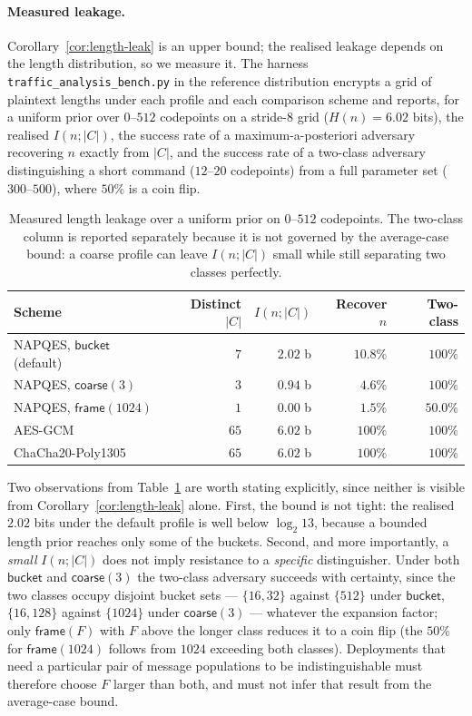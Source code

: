 \documentclass[11pt,a4paper]{article}
\begin{document}
\paragraph{Measured leakage.}
Corollary~\ref{cor:length-leak} is an upper bound; the realised leakage
depends on the length distribution, so we measure it. The harness
\texttt{traffic\_analysis\_bench.py} in the reference distribution encrypts a
grid of plaintext lengths under each profile and each comparison scheme and
reports, for a uniform prior over $0$--$512$ codepoints on a stride-$8$ grid
($H(n)=6.02$ bits), the realised $I(n;|C|)$, the success rate of a
maximum-a-posteriori adversary recovering $n$ exactly from $|C|$, and the
success rate of a two-class adversary distinguishing a short command
($12$--$20$ codepoints) from a full parameter set ($300$--$500$), where
$50\%$ is a coin flip.

\begin{table}[h]
\centering
\begin{tabular}{@{}lrrrr@{}}
\toprule
Scheme & Distinct $|C|$ & $I(n;|C|)$ & Recover $n$ & Two-class \\
\midrule
NAPQES, $\mathsf{bucket}$ (default) & $7$ & $2.02$ b & $10.8\%$ & $100\%$ \\
NAPQES, $\mathsf{coarse}(3)$        & $3$ & $0.94$ b & $4.6\%$ & $100\%$ \\
NAPQES, $\mathsf{frame}(1024)$      & $1$ & $0.00$ b & $1.5\%$ & $50.0\%$ \\
AES-GCM                             & $65$ & $6.02$ b & $100\%$ & $100\%$ \\
ChaCha20-Poly1305                   & $65$ & $6.02$ b & $100\%$ & $100\%$ \\
\bottomrule
\end{tabular}
\caption{Measured length leakage over a uniform prior on $0$--$512$
codepoints. The two-class column is reported separately because it is not
governed by the average-case bound: a coarse profile can leave $I(n;|C|)$
small while still separating two classes perfectly.}
\label{tab:length-leak-measured}
\end{table}

Two observations from Table~\ref{tab:length-leak-measured} are worth stating
explicitly, since neither is visible from
Corollary~\ref{cor:length-leak} alone. First, the bound is not tight: the
realised $2.02$ bits under the default profile is well below $\log_2 13$,
because a bounded length prior reaches only some of the buckets. Second, and
more importantly, a \emph{small} $I(n;|C|)$ does not imply resistance to a
\emph{specific} distinguisher. Under both $\mathsf{bucket}$ and
$\mathsf{coarse}(3)$ the two-class adversary succeeds with certainty, since
the two classes occupy disjoint bucket sets — $\{16,32\}$ against
$\{512\}$ under $\mathsf{bucket}$, $\{16,128\}$ against $\{1024\}$ under
$\mathsf{coarse}(3)$ — whatever the
expansion factor; only $\mathsf{frame}(F)$ with $F$ above the longer class
reduces it to a coin flip (the $50\%$ for $\mathsf{frame}(1024)$ follows
from $1024$ exceeding both classes). Deployments that need a particular pair of
message populations to be indistinguishable must therefore choose $F$
larger than both, and must not infer that result from the average-case
bound.
\end{document}
